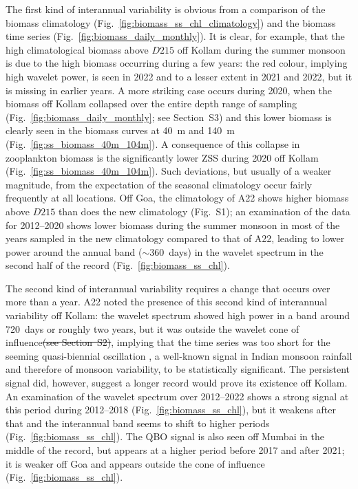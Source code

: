 \documentclass[authoryear,review,11pt]{elsarticle}
\providecommand{\DIFdeltex}[1]{{\protect\color{red}\sout{#1}}}                      %
\providecommand{\DIFdelbegin}{} %
\providecommand{\DIFdelend}{} %
\providecommand{\DIFdel}[1]{\texorpdfstring{\DIFdeltex{#1}}{}} %
\begin{document}
The first kind of interannual variability is obvious from a comparison of the biomass climatology (Fig.~\ref{fig:biomass_ss_chl_climatology}) and the biomass time series (Fig.~\ref{fig:biomass_daily_monthly}).  It is clear, for example, that the high climatological biomass above $D215$ off Kollam during the summer monsoon is due to the high biomass occurring during a few years: the red colour, implying high wavelet power, is seen in 2022 and to a lesser extent in 2021 and 2022, but it is missing in earlier years.  A more striking case occurs during 2020, when the biomass off Kollam collapsed over the entire depth range of sampling (Fig.~\ref{fig:biomass_daily_monthly}; see Section~S3) and this lower biomass is clearly seen in the biomass curves at 40~m and 140~m (Fig.~\ref{fig:ss_biomass_40m_104m}). A consequence of this collapse in zooplankton biomass is the  significantly lower ZSS during 2020 off Kollam (Fig.~\ref{fig:ss_biomass_40m_104m}).  Such deviations, but usually of a weaker magnitude, from the expectation of the seasonal climatology occur fairly frequently at all locations.  Off Goa, the climatology of A22 shows higher biomass above $D215$ than does the new climatology (Fig.~S1); an examination of the data for 2012--2020 shows lower biomass during the summer monsoon in most of the years sampled in the new climatology compared to that of A22, leading to lower power around the annual band ($\sim$360~days) in the wavelet spectrum in the second half of the record (Fig.~\ref{fig:biomass_ss_chl}).

The second kind of interannual variability requires a change that occurs over more than a year. A22 noted the presence of this second kind of interannual variability off Kollam: the wavelet spectrum showed high power in a band around 720~days or roughly two years, but it was outside the wavelet cone of influence\DIFdelbegin \DIFdel{(see Section~S2)}\DIFdelend , implying that the time series was too short for the seeming quasi-biennial oscillation \citep[QBO;][]{mooley1984fluctuations, bhalme1987tropical}, a well-known signal in Indian monsoon rainfall and therefore of monsoon variability, to be statistically significant.  The persistent signal did, however, suggest a longer record would prove its existence off Kollam.  An examination of the wavelet spectrum over 2012--2022 shows a strong signal at this period during 2012--2018 (Fig.~\ref{fig:biomass_ss_chl}), but it weakens after that and the interannual band seems to shift to higher periods (Fig.~\ref{fig:biomass_ss_chl}).  The QBO signal is also seen off Mumbai in the middle of the record, but appears at a higher period before 2017 and after 2021; it is weaker off Goa and appears outside the cone of influence (Fig.~\ref{fig:biomass_ss_chl}).
\end{document}
